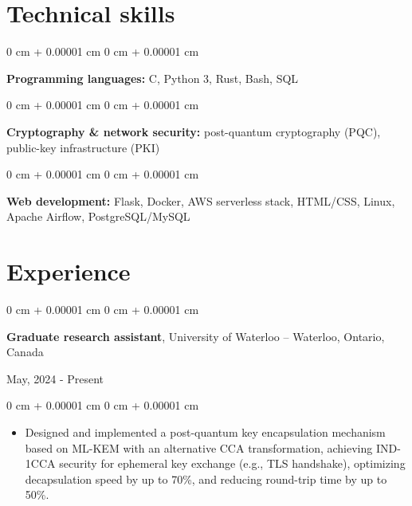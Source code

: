 \documentclass[10pt, letterpaper]{article}
\newenvironment{highlights}{
    \begin{itemize}[
        topsep=0.10 cm,
        parsep=0.10 cm,
        partopsep=0pt,
        itemsep=0pt,
        leftmargin=0 cm + 10pt
    ]
}{
    \end{itemize}
} %
\newenvironment{onecolentry}{
    \begin{adjustwidth}{
        0 cm + 0.00001 cm
    }{
        0 cm + 0.00001 cm
    }
}{
    \end{adjustwidth}
} %
\newenvironment{twocolentry}[2][]{
    \onecolentry
    \def\secondColumn{#2}
    \setcolumnwidth{\fill, 4.5 cm}
    \begin{paracol}{2}
}{
    \switchcolumn \raggedleft \secondColumn
    \end{paracol}
    \endonecolentry
} %
\begin{document}
    \section{Technical skills}
        \begin{onecolentry}
            \textbf{Programming languages:} C, Python 3, Rust, Bash, SQL
        \end{onecolentry}
        \vspace{0.2 cm}
        \begin{onecolentry}
            \textbf{Cryptography \& network security:} post-quantum cryptography (PQC), public-key infrastructure (PKI)
        \end{onecolentry}
        \vspace{0.2 cm}
        \begin{onecolentry}
            \textbf{Web development:} Flask, Docker, AWS serverless stack, HTML/CSS, Linux, Apache Airflow, PostgreSQL/MySQL
        \end{onecolentry}

    \section{Experience}
        \begin{twocolentry}{
            May, 2024 - Present
        }
            \textbf{Graduate research assistant}, University of Waterloo -- Waterloo, Ontario, Canada
        \end{twocolentry}
        \vspace{0.10 cm}
        \begin{onecolentry}
            \begin{highlights}
                \item Designed and implemented a post-quantum key encapsulation mechanism based on ML-KEM with an alternative CCA transformation, achieving IND-1CCA security for ephemeral key exchange (e.g., TLS handshake), optimizing decapsulation speed by up to 70\%, and reducing round-trip time by up to 50\%.
            \end{highlights}
        \end{onecolentry}
        \vspace{0.2 cm}
\end{document}
